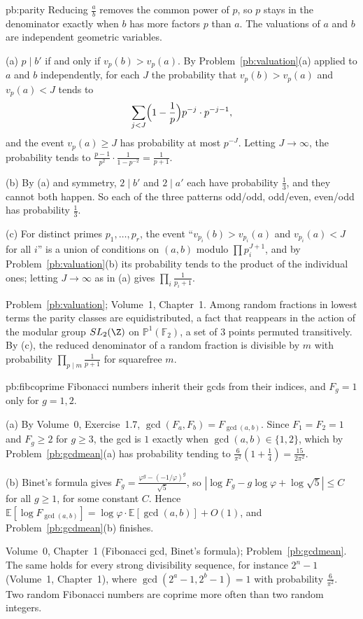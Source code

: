 \begin{solution}{pb:parity}
\idea Reducing $\frac ab$ removes the common power of $p$, so $p$ stays in the denominator exactly when $b$ has more factors $p$
than $a$. The valuations of $a$ and $b$ are independent geometric variables.

\writeup (a) $p\mid b'$ if and only if $v_p(b)>v_p(a)$. By Problem~\ref{pb:valuation}(a) applied to $a$ and $b$ independently, for
each $J$ the probability that $v_p(b)>v_p(a)$ and $v_p(a)<J$ tends to
\[
\sum_{j<J}\Bigl(1-\frac1p\Bigr)p^{-j}\cdot p^{-j-1},
\]
and the event $v_p(a)\ge J$ has probability at most $p^{-J}$. Letting $J\to\infty$, the probability tends to
$\frac{p-1}{p^2}\cdot\frac1{1-p^{-2}}=\frac1{p+1}$.

(b) By (a) and symmetry, $2\mid b'$ and $2\mid a'$ each have probability $\frac13$, and they cannot both happen. So each of the
three patterns odd/odd, odd/even, even/odd has probability $\frac13$.

(c) For distinct primes $p_1,\dots,p_r$, the event ``$v_{p_i}(b)>v_{p_i}(a)$ and $v_{p_i}(a)<J$ for all $i$'' is a union of
conditions on $(a,b)$ modulo $\prod p_i^{J+1}$, and by Problem~\ref{pb:valuation}(b) its probability tends to the product of the
individual ones; letting $J\to\infty$ as in (a) gives $\prod_i\frac1{p_i+1}$.

\tools Problem~\ref{pb:valuation}; Volume~1, Chapter~1.
\leads Among random fractions in lowest terms the parity classes are equidistributed, a fact that reappears in the action of the
modular group $SL_2(\Z)$ on $\mathbb P^1(\mathbb F_2)$, a set of $3$ points permuted transitively. By (c), the reduced denominator
of a random fraction is divisible by $m$ with probability $\prod_{p\mid m}\frac1{p+1}$ for squarefree $m$.
\end{solution}

\begin{solution}{pb:fibcoprime}
\idea Fibonacci numbers inherit their gcds from their indices, and $F_g=1$ only for $g=1,2$.

\writeup (a) By Volume~0, Exercise~1.7, $\gcd(F_a,F_b)=F_{\gcd(a,b)}$. Since $F_1=F_2=1$ and $F_g\ge2$ for $g\ge3$, the gcd is $1$ exactly
when $\gcd(a,b)\in\{1,2\}$, which by Problem~\ref{pb:gcdmean}(a) has probability tending to $\frac6{\pi^2}(1+\frac14)=\frac{15}{2\pi^2}$.

(b) Binet's formula gives $F_g=\frac{\varphi^g-(-1/\varphi)^g}{\sqrt5}$, so $|\log F_g-g\log\varphi+\log\sqrt5|\le C$ for all $g\ge1$,
for some constant $C$. Hence $\mathbb E[\log F_{\gcd(a,b)}]=\log\varphi\cdot\mathbb E[\gcd(a,b)]+O(1)$, and Problem~\ref{pb:gcdmean}(b)
finishes.

\tools Volume~0, Chapter~1 (Fibonacci gcd, Binet's formula); Problem~\ref{pb:gcdmean}.
\leads The same holds for every strong divisibility sequence, for instance $2^n-1$ (Volume~1, Chapter~1), where
$\gcd(2^a-1,2^b-1)=1$ with probability $\frac6{\pi^2}$. Two random Fibonacci numbers are coprime more often than two random integers.
\end{solution}

